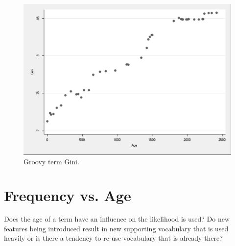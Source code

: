 \begin{figure}[t]
\centering
\includegraphics[width=\textwidth]{Figures/Vocab-GroovyGini.pdf}
\caption{Groovy term Gini.}
\label{fig:vocab-gini-groovy}
\end{figure}


\section{Frequency vs. Age} %
\label{sec:frequency_vs_age}

Does the age of a term have an influence on the likelihood is used? Do new features being introduced result in new supporting vocabulary that is used heavily or is there a tendency to re-use vocabulary that is already there?




